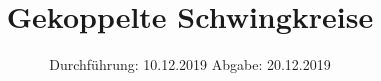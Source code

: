 

\subject{Versuch 355}
\title{Gekoppelte Schwingkreise}
\date{%
  Durchführung: 10.12.2019
  \hspace{3em}
  Abgabe: 20.12.2019
}



\maketitle

\thispagestyle{empty}
\tableofcontents
\newpage



%





\printbibliography{}


